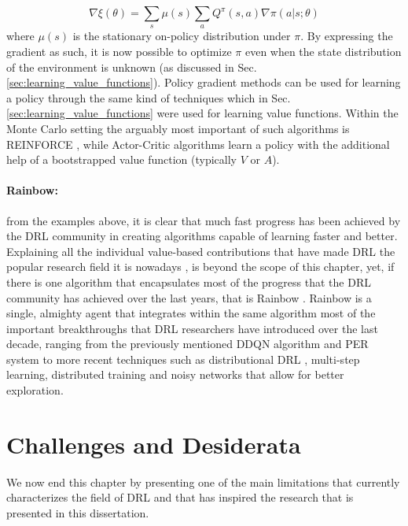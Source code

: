 \begin{equation}
	\nabla \xi(\theta) = \sum_{s} \mu(s) \sum_{a} Q^{\pi}(s,a) \nabla \pi(a|s;\theta)
\end{equation}
where $\mu(s)$ is the stationary on-policy distribution under $\pi$. By expressing the gradient as such, it is now possible to optimize $\pi$ even when the state distribution of the environment is unknown (as discussed in Sec. \ref{sec:learning_value_functions}). Policy gradient methods can be used for learning a policy through the same kind of techniques which in Sec. \ref{sec:learning_value_functions} were used for learning value functions. Within the Monte Carlo setting the arguably most important of such algorithms is REINFORCE \cite{williams1992simple}, while Actor-Critic algorithms \cite{lillicrap2015continuous,schulman2015high,schulman2015trust,wang2016sample,mnih2016asynchronous,schulman2017proximal,haarnoja2018soft,fujimoto2018addressing} learn a policy with the additional help of a bootstrapped value function (typically $V$ or $A$).


\paragraph{Rainbow:} from the examples above, it is clear that much fast progress has been achieved by the DRL community in creating algorithms capable of learning faster and better. Explaining all the individual value-based contributions that have made DRL the popular research field it is nowadays \cite{henderson2018deep}, is beyond the scope of this chapter, yet, if there is one algorithm that encapsulates most of the progress that the DRL community has achieved over the last years, that is Rainbow \cite{hessel2018rainbow}. Rainbow is a single, almighty agent that integrates within the same algorithm most of the important breakthroughs that DRL researchers have introduced over the last decade, ranging from the previously mentioned DDQN algorithm and PER system to more recent techniques such as distributional DRL \cite{bellemare2017distributional}, multi-step learning, distributed training \cite{mnih2016asynchronous} and noisy networks \cite{fortunato2017noisy} that allow for better exploration.


\section{Challenges and Desiderata}
\label{sec:challenges}
We now end this chapter by presenting one of the main limitations that currently characterizes the field of DRL and that has inspired the research that is presented in this dissertation.

